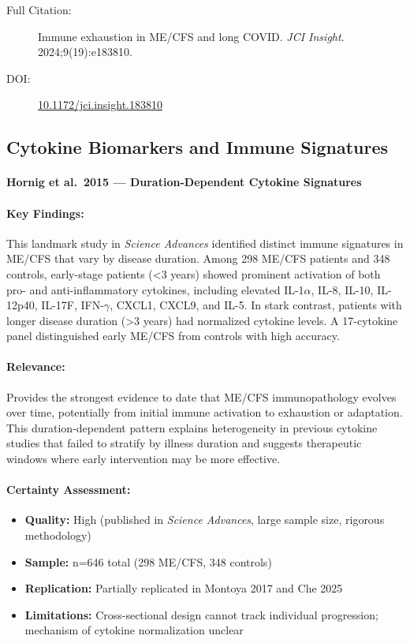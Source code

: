 \begin{description}
    \item[Full Citation:] Immune exhaustion in ME/CFS and long COVID. \textit{JCI Insight}. 2024;9(19):e183810.
    \item[DOI:] \href{https://doi.org/10.1172/jci.insight.183810}{10.1172/jci.insight.183810}
\end{description}

\subsection{Cytokine Biomarkers and Immune Signatures}

\paragraph{Hornig et al.\ 2015 --- Duration-Dependent Cytokine Signatures}

\cite{Hornig2015}

\paragraph{Key Findings:}
This landmark study in \emph{Science Advances} identified distinct immune signatures in ME/CFS that vary by disease duration. Among 298 ME/CFS patients and 348 controls, early-stage patients (<3 years) showed prominent activation of both pro- and anti-inflammatory cytokines, including elevated IL-1$\alpha$, IL-8, IL-10, IL-12p40, IL-17F, IFN-$\gamma$, CXCL1, CXCL9, and IL-5. In stark contrast, patients with longer disease duration (>3 years) had normalized cytokine levels. A 17-cytokine panel distinguished early ME/CFS from controls with high accuracy.

\paragraph{Relevance:}
Provides the strongest evidence to date that ME/CFS immunopathology evolves over time, potentially from initial immune activation to exhaustion or adaptation. This duration-dependent pattern explains heterogeneity in previous cytokine studies that failed to stratify by illness duration and suggests therapeutic windows where early intervention may be more effective.

\paragraph{Certainty Assessment:}
\begin{itemize}
    \item \textbf{Quality:} High (published in \emph{Science Advances}, large sample size, rigorous methodology)
    \item \textbf{Sample:} n=646 total (298 ME/CFS, 348 controls)
    \item \textbf{Replication:} Partially replicated in Montoya 2017 and Che 2025
    \item \textbf{Limitations:} Cross-sectional design cannot track individual progression; mechanism of cytokine normalization unclear
\end{itemize}

